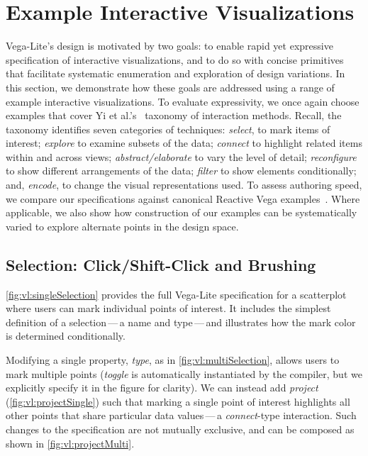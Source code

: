 \section{Example Interactive Visualizations}
\label{sec:vl:examples}

Vega-Lite's design is motivated by two goals: to enable rapid yet expressive
specification of interactive visualizations, and to do so with concise
primitives that facilitate systematic enumeration and exploration of design
variations. In this section, we demonstrate how these goals are addressed using
a range of example interactive visualizations. To evaluate expressivity, we once
again choose examples that cover Yi et al.'s~\cite{yi:understanding} taxonomy of
interaction methods. Recall, the taxonomy identifies seven categories of
techniques: \emph{select}, to mark items of interest; \emph{explore} to examine
subsets of the data; \emph{connect} to highlight related items within and across
views; \emph{abstract/elaborate} to vary the level of detail; \emph{reconfigure}
to show different arrangements of the data; \emph{filter} to show elements
conditionally; and, \emph{encode}, to change the visual representations used. To
assess authoring speed, we compare our specifications against canonical Reactive
Vega examples~\cite{reactive-vega-arch, reactive-vega-model, vega:editor}. Where
applicable, we also show how construction of our examples can be systematically
varied to explore alternate points in the design space.

\subsection{Selection: Click/Shift-Click and Brushing}

\cref{fig:vl:singleSelection} provides the full Vega-Lite specification for a
scatterplot where users can mark individual points of interest. It includes the
simplest definition of a selection\,---\,a name and type\,---\,and illustrates
how the mark color is determined conditionally.

Modifying a single property, \emph{type}, as in \cref{fig:vl:multiSelection},
allows users to mark multiple points (\emph{toggle} is automatically
instantiated by the compiler, but we explicitly specify it in the figure for
clarity). We can instead add \emph{project} (\cref{fig:vl:projectSingle})
such that marking a single point of interest highlights all other points that
share particular data values\,---\,a \emph{connect}-type interaction. Such
changes to the specification are not mutually exclusive, and can be composed as
shown in \cref{fig:vl:projectMulti}.

